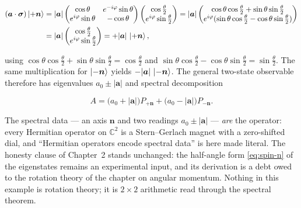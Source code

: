 \begin{linenomath}
\begin{align}
    (\bm a\cdot\bm\sigma)\ket{+\bm n}
    &= |\bm a|
    \begin{pmatrix}
        \cos\theta & e^{-i\varphi}\sin\theta\\
        e^{i\varphi}\sin\theta & -\cos\theta
    \end{pmatrix}
    \begin{pmatrix}
        \cos\frac{\theta}{2}\\
        e^{i\varphi}\sin\frac{\theta}{2}
    \end{pmatrix}
    = |\bm a|
    \begin{pmatrix}
        \cos\theta\cos\frac{\theta}{2}+\sin\theta\sin\frac{\theta}{2}\\
        e^{i\varphi}(\sin\theta\cos\frac{\theta}{2}-\cos\theta\sin\frac{\theta}{2})
    \end{pmatrix}\nonumber\\
    &= |\bm a|
    \begin{pmatrix}
        \cos\frac{\theta}{2}\\
        e^{i\varphi}\sin\frac{\theta}{2}
    \end{pmatrix}
    = +|\bm a|\,\ket{+\bm n},
\end{align}
\end{linenomath}
using $\cos\theta\cos\frac{\theta}{2}+\sin\theta\sin\frac{\theta}{2}=\cos\frac{\theta}{2}$ and $\sin\theta\cos\frac{\theta}{2}-\cos\theta\sin\frac{\theta}{2}=\sin\frac{\theta}{2}$. The same multiplication for $\ket{-\bm n}$ yields $-|\bm a|\,\ket{-\bm n}$. The general two-state observable therefore has eigenvalues $a_0\pm|\bm a|$ and spectral decomposition
\begin{linenomath}
\begin{equation}
    A=\bigl(a_0+|\bm a|\bigr)P_{+\bm n}+\bigl(a_0-|\bm a|\bigr)P_{-\bm n} .
\end{equation}
\end{linenomath}
The spectral data --- an axis $\bm n$ and two readings $a_0\pm|\bm a|$ --- \emph{are} the operator: every Hermitian operator on $\mathbb C^2$ is a Stern--Gerlach magnet with a zero-shifted dial, and ``Hermitian operators encode spectral data'' is here made literal. The honesty clause of Chapter~2 stands unchanged: the half-angle form \eqref{eq:spin-n} of the eigenstates remains an experimental input, and its derivation is a debt owed to the rotation theory of the chapter on angular momentum. Nothing in this example is rotation theory; it is $2\times2$ arithmetic read through the spectral theorem.

